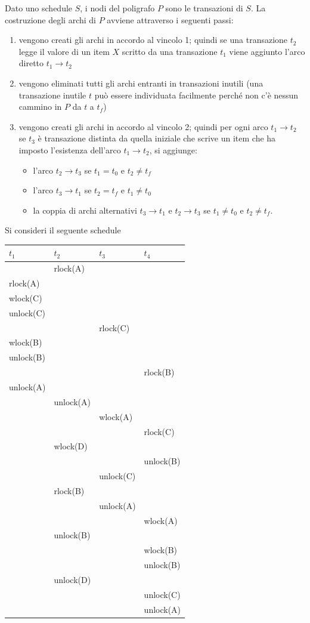 \begin{alg}
Dato uno schedule $S$, i nodi del poligrafo $P$ sono le transazioni di $S$. La costruzione degli archi di $P$ 
avviene attraverso i seguenti passi:
\begin{enumerate}
 \item vengono creati gli archi in accordo al vincolo 1; quindi se una transazione $t_2$ legge il valore di
un item $X$ scritto da una transazione $t_1$ viene aggiunto l'arco diretto $t_1\rightarrow t_2$
 \item vengono eliminati tutti gli archi entranti in transazioni inutili (una transazione inutile $t$ può
essere individuata facilmente perché non c'è nessun cammino in $P$ da $t$ a $t_f$)
 \item vengono creati gli archi in accordo al vincolo 2; quindi per ogni arco $t_1\rightarrow t_2$ se $t_3$ è transazione
distinta da quella iniziale che scrive un item che ha imposto l'esistenza dell'arco $t_1\rightarrow t_2$, si
aggiunge:
\begin{itemize}
 \item l'arco $t_2\rightarrow t_3$ se $t_1 = t_0$ e $t_2 \not= t_f$
 \item l'arco $t_3\rightarrow t_1$ se $t_2 = t_f$ e $t_1 \not= t_0$
 \item la coppia di archi alternativi $t_3\rightarrow t_1$ e $t_2\rightarrow t_3$ se $t_1 \not= t_0$ e $t_2 \not= t_f$.
\end{itemize}
\end{enumerate}
\end{alg}
Si consideri il seguente schedule
\begin{center}
 \begin{longtable}{|l|l|l|l|}
  \hline
  $t_1$ & $t_2$ & $t_3$ & $t_4$\\
  \hline
  & rlock(A) & & \\
  rlock(A) & & & \\
  wlock(C) & & & \\
  unlock(C) & & & \\
  & & rlock(C) & \\
  wlock(B) & & & \\
  unlock(B)& & & \\
  & & & rlock(B)\\
  unlock(A) & & & \\
  & unlock(A)& &\\
  & & wlock(A)& \\
  & & & rlock(C)\\
  & wlock(D) & & \\
 & & & unlock(B)\\
  & &unlock(C)&\\
 & rlock(B) & & \\
  & & unlock(A)& \\
 & & & wlock(A)\\
 & unlock(B)& &\\
 & & & wlock(B)\\
 & & & unlock(B)\\
 & unlock(D) & &\\
   & & &unlock(C)\\
 & & & unlock(A)\\
\hline
 \end{longtable}
\end{center}
